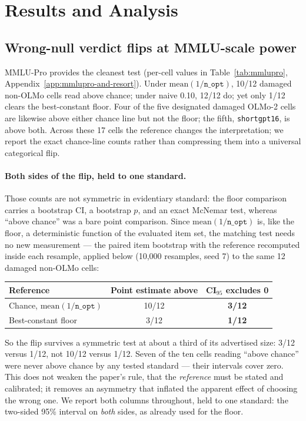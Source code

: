 \section{Results and Analysis}

\subsection{Wrong-null verdict flips at MMLU-scale power}
\label{sec:flips}

MMLU-Pro provides the cleanest test (per-cell values in Table~\ref{tab:mmlupro}, Appendix~\ref{app:mmlupro-and-resort}).
Under $\mathrm{mean}(1/\texttt{n\_opt})$, 10/12 damaged non-OLMo cells read above chance; under naive 0.10, 12/12 do; yet only 1/12 clears the best-constant floor. Four of the five designated damaged OLMo-2 cells are likewise above either chance line but not the floor; the fifth, \texttt{shortgpt16}, is above both. Across these 17 cells the reference changes the interpretation; we report the exact chance-line counts rather than compressing them into a universal categorical flip.

\paragraph{Both sides of the flip, held to one standard.}
Those counts are not symmetric in evidentiary standard: the floor comparison carries a bootstrap CI, a bootstrap $p$, and an exact McNemar test, whereas ``above chance'' was a bare point comparison. Since $\mathrm{mean}(1/\texttt{n\_opt})$ is, like the floor, a deterministic function of the evaluated item set, the matching test needs no new measurement --- the paired item bootstrap with the reference recomputed inside each resample, applied below (10{,}000 resamples, seed 7) to the same 12 damaged non-OLMo cells:

\begin{center}
\begin{tabular}{lcc}
\toprule
Reference & Point estimate above & CI$_{95}$ excludes 0 \\
\midrule
Chance, $\mathrm{mean}(1/\texttt{n\_opt})$ & 10/12 & \textbf{3/12} \\
Best-constant floor & 3/12 & \textbf{1/12} \\
\bottomrule
\end{tabular}
\end{center}

So the flip survives a symmetric test at about a third of its advertised size: 3/12 versus 1/12, not 10/12 versus 1/12. Seven of the ten cells reading ``above chance'' were never above chance by any tested standard --- their intervals cover zero. This does not weaken the paper's rule, that the \emph{reference} must be stated and calibrated; it removes an asymmetry that inflated the apparent effect of choosing the wrong one. We report both columns throughout, held to one standard: the two-sided 95\% interval on \emph{both} sides, as already used for the floor.

